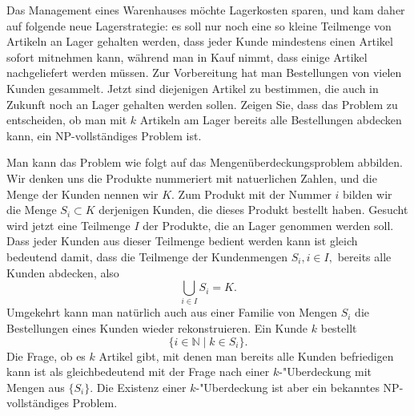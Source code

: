 Das Management eines Warenhauses möchte Lagerkosten sparen, und
kam daher auf folgende neue Lagerstrategie: es soll nur noch eine
so kleine Teilmenge von Artikeln an Lager gehalten werden, dass
jeder Kunde mindestens einen Artikel sofort mitnehmen kann, während
man in Kauf nimmt, dass einige Artikel nachgeliefert werden müssen.
Zur Vorbereitung hat man Bestellungen von vielen Kunden gesammelt.
Jetzt sind diejenigen Artikel zu bestimmen, die auch in Zukunft
noch an Lager gehalten werden sollen. Zeigen Sie, dass das Problem
zu entscheiden, ob man mit $k$ Artikeln am Lager bereits alle
Bestellungen abdecken kann, ein NP-vollständiges Problem ist.

\begin{loesung}
Man kann das Problem wie folgt auf das Mengenüberdeckungsproblem
abbilden.
Wir denken uns die Produkte nummeriert mit natuerlichen Zahlen,
und die Menge der Kunden nennen wir $K$.
Zum Produkt mit der Nummer $i$ bilden wir die Menge
$S_i\subset K$ derjenigen Kunden, die dieses Produkt bestellt haben.
Gesucht wird jetzt eine Teilmenge $I$ der Produkte, die an Lager
genommen werden soll. Dass jeder Kunden aus dieser Teilmenge
bedient werden kann ist gleich bedeutend damit, dass die Teilmenge
der Kundenmengen $S_i, i\in I,$ bereits alle Kunden abdecken, also
\[
\bigcup_{i\in I}S_i=K.
\]
Umgekehrt kann man natürlich auch aus einer Familie von Mengen
$S_i$ die Bestellungen eines Kunden wieder rekonstruieren. Ein
Kunde $k$ bestellt
\[
\{i\in \mathbb N\;|\;k\in S_i\}.
\]
Die Frage, ob es $k$ Artikel gibt, mit denen man bereits alle
Kunden befriedigen kann ist als gleichbedeutend mit der Frage
nach einer $k$-"Uberdeckung mit Mengen aus $\{S_i\}$. Die
Existenz einer $k$-"Uberdeckung ist aber ein bekanntes NP-vollständiges
Problem.
\end{loesung}
